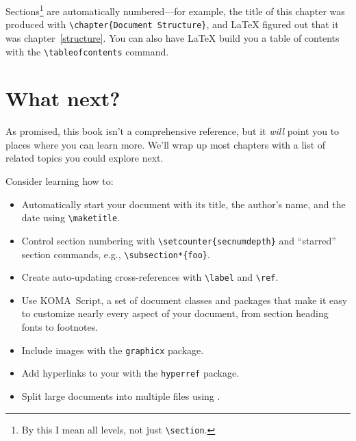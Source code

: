 Sections\footnote{By this I mean all levels, not just
\texttt{\textbackslash section}.}
are automatically numbered---for example,
the title of this chapter was produced with \verb|\chapter{Document Structure}|,
and \LaTeX{} figured out that it was chapter~\ref{structure}.
You can also have \LaTeX{} build you a table of contents
with the \verb|\tableofcontents| command.

\section{What next?}

As promised, this book isn't a comprehensive reference,
but it \emph{will} point you to places where you can learn more.
We'll wrap up most chapters with a list of related topics you could
explore next.

Consider learning how to:
\begin{itemize}
\item Automatically start your document with its title, the author's name,
    and the date using \verb|\maketitle|.
\item Control section numbering with \verb|\setcounter{secnumdepth}|
and ``starred'' section commands, e.g., \verb|\subsection*{foo}|.
\item Create auto-updating cross-references with \verb|\label| and \verb|\ref|.
\item Use KOMA~Script, a set of document classes and packages
that make it easy to customize nearly every aspect of your document,
from section heading fonts to footnotes.
\item Include images with the \texttt{graphicx} package.
\item Add hyperlinks to your  with the \texttt{hyperref} package.
\item Split large documents into multiple files using \verb||.
\end{itemize}
